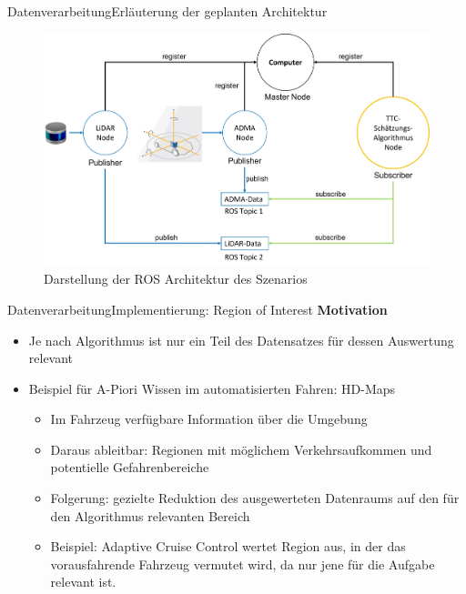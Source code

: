 \documentclass[169, handout	]{THIbeamer} %
\begin{document}
	\begin{frame}{Datenverarbeitung}{Erläuterung der geplanten Architektur}
		\begin{figure}
			\includegraphics[scale=0.35]{required/ROS_Architecture.jpg}
			\caption{Darstellung der ROS Architektur des Szenarios}
		\end{figure}
	\end{frame}
	\begin{frame}{Datenverarbeitung}{Implementierung: Region of Interest}
		\textbf{Motivation}
		\begin{itemize}
			\item Je nach Algorithmus ist nur ein Teil des Datensatzes für dessen Auswertung relevant
			\item Beispiel für A-Piori Wissen im automatisierten Fahren: HD-Maps
			\begin{itemize}
				\item Im Fahrzeug verfügbare Information über die Umgebung
				\item Daraus ableitbar: Regionen mit möglichem Verkehrsaufkommen und potentielle Gefahrenbereiche
				\item Folgerung: gezielte Reduktion des ausgewerteten Datenraums auf den für den Algorithmus relevanten Bereich
				\item Beispiel: Adaptive Cruise Control wertet Region aus, in der das vorausfahrende Fahrzeug vermutet wird, da nur jene für die Aufgabe relevant ist.
			\end{itemize}
		\end{itemize}
	\end{frame}
\end{document}
